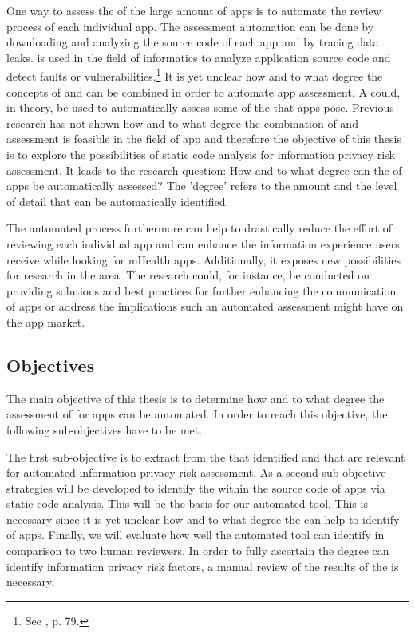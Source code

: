 One way to assess the \ipr of the large amount of \mH apps is to automate the review process of each individual app. 
The assessment automation can be done by downloading and analyzing the source code of each app and by tracing data leaks. 
\Sca is used in the field of informatics to analyze application source code and detect faults or vulnerabilities.\footnote{See \cite{Baca2008}, p. 79.} 
It is yet unclear how and to what degree the concepts of \sca and \pra can be combined in order to automate app assessment.
A \sca could, in theory, be used to automatically assess some of the \ipr that \mH apps pose.
Previous research has not shown how and to what degree the combination of \sca and \ipr assessment is feasible in the field of \mH app \pra and therefore the objective of this thesis is to explore the possibilities of static code analysis for information privacy risk assessment. 
It leads to the research question: How and to what degree can the \ipr of \mH apps be automatically assessed?
The 'degree' refers to the amount and the level of detail that \iprfs can be automatically identified.

The automated process furthermore can help to drastically reduce the effort of reviewing each individual app and can enhance the information experience users receive while looking for mHealth apps.
Additionally, it exposes new possibilities for research in the \ipr area. 
The research could, for instance, be conducted on providing solutions and best practices for further enhancing the \ipr communication of apps or address the implications such an automated assessment might have on the app market.

\subsection{Objectives}\label{chapter:Objectives}

The main objective of this thesis is to determine how and to what degree the assessment of \iprfs for \mH apps can be automated.
In order to reach this objective, the following sub-objectives have to be met.

The first sub-objective is to extract \iprfs from the \ipp that \textcite{Dehling2016} identified and that are relevant for automated information privacy risk assessment.
As a second sub-objective strategies will be developed to identify the \iprfs within the source code of \mH apps via static code analysis.
This will be the basis for our automated \pra tool.
This is necessary since it is yet unclear how and to what degree the \sca can help to identify \iprfs of \mH apps. 
Finally, we will evaluate how well the automated \pra tool can identify \iprfs in comparison to two human reviewers.
In order to fully ascertain the degree \sca can identify information privacy risk factors, a manual review of the results of the \sca is necessary.

